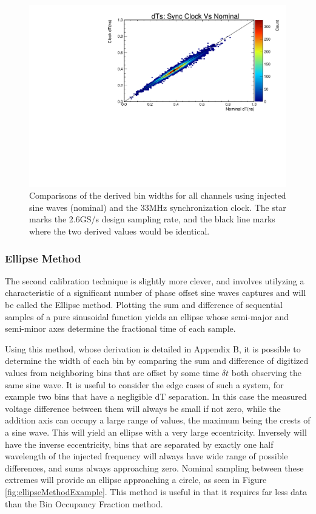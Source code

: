 		
	\begin{figure}
		\includegraphics[width=\textwidth]{figures/nominalDtVsSyncClockDt}
		\caption{Comparisons of the derived bin widths for all channels using injected sine waves (nominal) and the 33MHz synchronization clock.  The star marks the 2.6GS/s design sampling rate, and the black line marks where the two derived values would be identical.}
		\label{fig:dTNominalVsSyncClock}
	\end{figure}


	\subsubsection{Ellipse Method}	
		The second calibration technique is slightly more clever, and involves utilyzing a characteristic of a significant number of phase offset sine waves captures and will be called the Ellipse method.  Plotting the sum and difference of sequential samples of a pure sinusoidal function yields an ellipse whose semi-major and semi-minor axes determine the fractional time of each sample.  
		
		Using this method, whose derivation is detailed in Appendix B, it is possible to determine the width of each bin by comparing the sum and difference of digitized values from neighboring bins that are offset by some time $\delta t$ both observing the same sine wave.  It is useful to consider the edge cases of such a system, for example two bins that have a negligible dT separation.  In this case the measured voltage difference between them will always be small if not zero, while the addition axis can occupy a large range of values, the maximum being the crests of a sine wave. This will yield an ellipse with a very large eccentricity.  Inversely will have the inverse eccentricity, bins that are separated by exactly one half wavelength of the injected frequency will always have wide range of possible differences, and sums always approaching zero.  Nominal sampling between these extremes will provide an ellipse approaching a circle, as seen in Figure \ref{fig:ellipseMethodExample}.  This method is useful in that it requires far less data than the Bin Occupancy Fraction method.  
		
